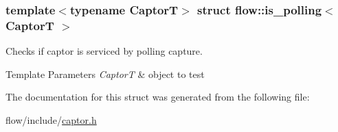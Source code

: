 \subsubsection*{template$<$typename CaptorT$>$\newline
struct flow\+::is\+\_\+polling$<$ Captor\+T $>$}

Checks if captor is serviced by polling capture. 


\begin{DoxyTemplParams}{Template Parameters}
{\em CaptorT} & object to test \\
\hline
\end{DoxyTemplParams}


The documentation for this struct was generated from the following file\+:\begin{DoxyCompactItemize}
\item 
flow/include/\hyperlink{captor_8h}{captor.\+h}\end{DoxyCompactItemize}
